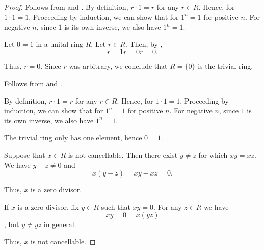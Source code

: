 \begin{proof}
   Follows from  and .
   By definition, \( r \cdot 1 = r \) for any \( r \in R \). Hence, for \( 1 \cdot 1 = 1 \). Proceeding by induction, we can show that for \( 1^n = 1 \) for positive \( n \). For negative \( n \), since \( 1 \) is its own inverse, we also have \( 1^n = 1 \).

  Let \( 0 = 1 \) in a unital ring \( R \). Let \( r \in R \). Then, by ,
  \begin{equation*}
    r = 1r = 0r = 0.
  \end{equation*}

  Thus, \( r = 0 \). Since \( r \) was arbitrary, we conclude that \( R = \{ 0 \} \) is the trivial ring.

   Follows from  and .

   By definition, \( r \cdot 1 = r \) for any \( r \in R \). Hence, for \( 1 \cdot 1 = 1 \). Proceeding by induction, we can show that for \( 1^n = 1 \) for positive \( n \). For negative \( n \), since \( 1 \) is its own inverse, we also have \( 1^n = 1 \).

   The trivial ring only has one element, hence \( 0 = 1 \).

  Suppose that \( x \in R \) is not cancellable. Then there exist \( y \neq z \) for which \( xy = xz \). We have \( y - z \neq 0 \) and
  \begin{equation*}
    x(y - z) = xy - xz = 0.
  \end{equation*}

  Thus, \( x \) is a zero divisor.

   If \( x \) is a zero divisor, fix \( y \in R \) such that \( xy = 0 \). For any \( z \in R \) we have
  \begin{equation*}
    xy = 0 = x(yz)
  \end{equation*}
 , but \( y \neq yz \) in general.

  Thus, \( x \) is not cancellable.
\end{proof}

